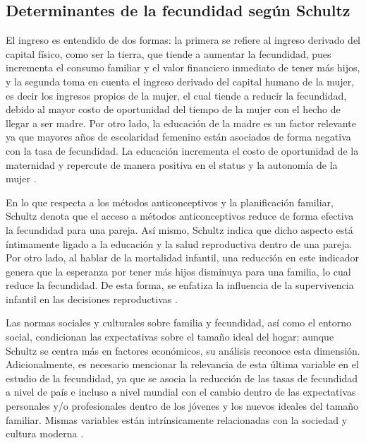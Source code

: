 \documentclass[Royal,times,sageh]{sagej}
\begin{document}
\subsection{Determinantes de la fecundidad según
Schultz}\label{determinantes-de-la-fecundidad-seguxfan-schultz}

El ingreso es entendido de dos formas: la primera se refiere al ingreso
derivado del capital físico, como ser la tierra, que tiende a aumentar
la fecundidad, pues incrementa el consumo familiar y el valor financiero
inmediato de tener más hijos, y la segunda toma en cuenta el ingreso
derivado del capital humano de la mujer, es decir los ingresos propios
de la mujer, el cual tiende a reducir la fecundidad, debido al mayor
costo de oportunidad del tiempo de la mujer con el hecho de llegar a ser
madre. Por otro lado, la educación de la madre es un factor relevante ya
que mayores años de escolaridad femenino están asociados de forma
negativa con la tasa de fecundidad. La educación incrementa el costo de
oportunidad de la maternidad y repercute de manera positiva en el status
y la autonomía de la mujer \citep{enriquez2017determinantes}.

En lo que respecta a los métodos anticonceptivos y la planificación
familiar, Schultz denota que el acceso a métodos anticonceptivos reduce
de forma efectiva la fecundidad para una pareja. Así mismo, Schultz
indica que dicho aspecto está íntimamente ligado a la educación y la
salud reproductiva dentro de una pareja. Por otro lado, al hablar de la
mortalidad infantil, una reducción en este indicador genera que la
esperanza por tener más hijos disminuya para una familia, lo cual reduce
la fecundidad. De esta forma, se enfatiza la influencia de la
supervivencia infantil en las decisiones reproductivas
\citep{schultz2006fertility}.

Las normas sociales y culturales sobre familia y fecundidad, así como el
entorno social, condicionan las expectativas sobre el tamaño ideal del
hogar; aunque Schultz se centra más en factores económicos, su análisis
reconoce esta dimensión. Adicionalmente, es necesario mencionar la
relevancia de esta última variable en el estudio de la fecundidad, ya
que se asocia la reducción de las tasas de fecundidad a nivel de país e
incluso a nivel mundial con el cambio dentro de las expectativas
personales y/o profesionales dentro de los jóvenes y los nuevos ideales
del tamaño familiar. Mismas variables están intrínsicamente relacionadas
con la sociedad y cultura moderna \citep{enriquez2017determinantes}.
\end{document}
